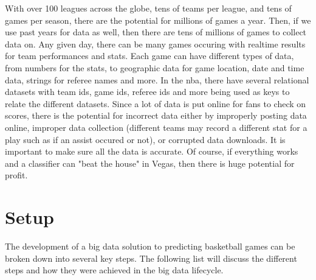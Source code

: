 \documentclass[12pt]{article}%
\begin{document}
With over 100 leagues across the globe, tens of teams per league, and tens of games per season, there are the potential for millions of games a year. Then, if we use past years for data as well, then there are tens of millions of games to collect data on. Any given day, there can be many games occuring with realtime results for team performances and stats. Each game can have different types of data, from numbers for the stats, to geographic data for game location, date and time data, strings for referee names and more. In the nba, there have several relational datasets with team ids, game ids, referee ids and more being used as keys to relate the different datasets. Since a lot of data is put online for fans to check on scores, there is the potential for incorrect data either by improperly posting data online, improper data collection (different teams may record a different stat for a play such as if an assist occured or not), or corrupted data downloads. It is important to make sure all the data is accurate. Of course, if everything works and a classifier can "beat the house" in Vegas, then there is huge potential for profit.


\section{Setup}
The development of a big data solution to predicting basketball games can be broken down into several key steps. The following list will discuss the different steps and how they were achieved in the big data lifecycle.
\end{document}

